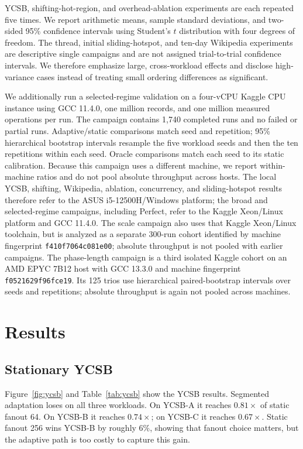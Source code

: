 \documentclass[sigconf,review,anonymous]{acmart}
\begin{document}
YCSB, shifting-hot-region, and overhead-ablation experiments are each repeated
five times.  We report arithmetic means, sample standard deviations, and
two-sided 95\% confidence intervals using Student's \(t\) distribution with
four degrees of freedom.  The thread, initial sliding-hotspot, and ten-day
Wikipedia experiments are descriptive single campaigns and are not assigned
trial-to-trial confidence intervals.  We therefore emphasize large,
cross-workload effects and disclose high-variance cases instead of treating
small ordering differences as significant.

We additionally run a selected-regime validation on a four-vCPU Kaggle CPU
instance using GCC 11.4.0, one million records, and one million measured
operations per run.  The campaign contains 1,740 completed runs and no failed
or partial runs.  Adaptive/static comparisons match seed and repetition; 95\%
hierarchical bootstrap intervals resample the five workload seeds and then the
ten repetitions within each seed.  Oracle comparisons match each seed to its
static calibration.  Because this campaign uses a different machine, we report
within-machine ratios and do not pool absolute throughput across hosts.
The local YCSB, shifting, Wikipedia, ablation, concurrency, and sliding-hotspot
results therefore refer to the ASUS i5-12500H/Windows platform; the broad and
selected-regime campaigns, including Perfect, refer to the Kaggle Xeon/Linux
platform and GCC 11.4.0.  The scale campaign also uses that Kaggle
Xeon/Linux toolchain, but is analyzed as a separate 300-run cohort identified
by machine fingerprint \texttt{f410f7064c081e00}; absolute throughput is not
pooled with earlier campaigns.
The phase-length campaign is a third isolated Kaggle cohort on an AMD EPYC
7B12 host with GCC 13.3.0 and machine fingerprint
\texttt{f0521629f96fce19}.  Its 125 trios use hierarchical paired-bootstrap
intervals over seeds and repetitions; absolute throughput is again not pooled
across machines.

\section{Results}

\subsection{Stationary YCSB}

Figure~\ref{fig:ycsb} and Table~\ref{tab:ycsb} show the YCSB results.
Segmented adaptation loses on all three workloads.  On YCSB-A it reaches
\(0.81\times\) of static fanout 64.  On YCSB-B it reaches \(0.74\times\);
on YCSB-C it reaches \(0.67\times\).  Static fanout 256 wins YCSB-B by
roughly \(6\%\), showing that fanout choice matters, but the adaptive path is
too costly to capture this gain.
\end{document}

